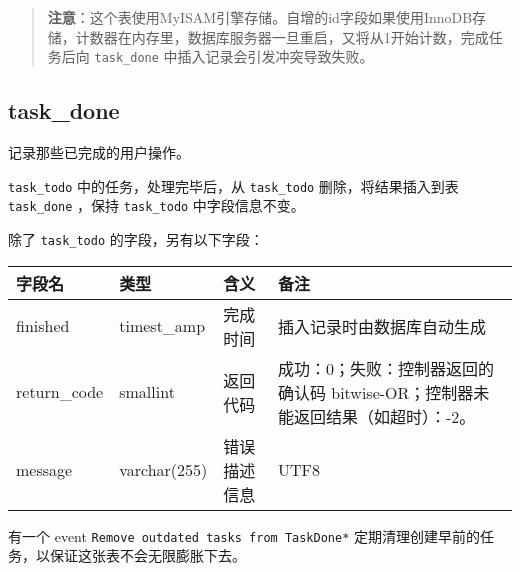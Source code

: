 \begin{quote}
\textbf{注意}：这个表使用MyISAM引擎存储。自增的id字段如果使用InnoDB存储，计数器在内存里，数据库服务器一旦重启，又将从1开始计数，完成任务后向
\texttt{task\_done} 中插入记录会引发冲突导致失败。
\end{quote}

\subsection{task\_done}\label{taskux5fdone}

记录那些已完成的用户操作。

\texttt{task\_todo} 中的任务，处理完毕后，从 \texttt{task\_todo}
删除，将结果插入到表 \texttt{task\_done} ，保持 \texttt{task\_todo}
中字段信息不变。

除了 \texttt{task\_todo} 的字段，另有以下字段：

\begin{longtabu}[c]{@{}lXXX@{}}
\toprule
字段名 & 类型 & 含义 & 备注\tabularnewline
\midrule
\endhead
finished & timest\_amp & 完成时间 &
插入记录时由数据库自动生成\tabularnewline
return\_code & smallint & 返回代码 & 成功：0；失败：控制器返回的确认码
bitwise-OR；控制器未能返回结果（如超时）：-2。\tabularnewline
message & varchar(255) & 错误描述信息 & UTF8\tabularnewline
\bottomrule
\end{longtabu}

有一个 event \texttt{Remove outdated tasks from TaskDone*}
定期清理创建早前的任务，以保证这张表不会无限膨胀下去。
